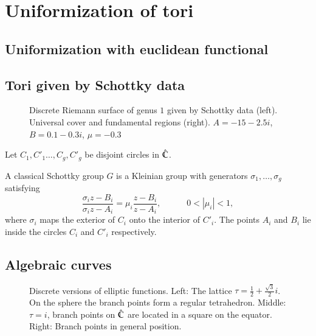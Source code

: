 \documentclass[Thesis.tex]{subfiles}
\begin{document}
  \section{Uniformization of tori}
  \label{sec:tori}

  \subsection{Uniformization with euclidean functional}

  \subsection{Tori given by Schottky data}

  \begin{figure}
  \centering
      \caption{Discrete Riemann surface of genus $1$ given by Schottky data (left). Universal cover and fundamental regions (right). $A=-15-2.5i$, $B=0.1-0.3i$, $\mu=-0.3$}
  \label{fig:schottky_g1}
  \end{figure}

  Let $C_1,C'_1\ldots,C_g,C'_g$ be disjoint circles in $\hat{\mathbb C}$.
  \begin{definition} A classical Schottky group $G$ is a Kleinian group with generators $\sigma_1,\ldots,\sigma_g$ satisfying
  \[
  \frac{\sigma_i z - B_i}{\sigma_i z - A_i} = \mu_i \frac{z - B_i}{z - A_i},
  \quad\quad\quad 0 < \left|\mu_i\right|<1,
  \]
  where $\sigma_i$ maps the exterior of $C_i$ onto the interior of $C'_i$. The points $A_i$ and $B_i$ lie inside the circles $C_i$ and $C'_i$ respectively.
  \end{definition}

  \subsection{Algebraic curves}
  \label{sec:discrete_algebraic_curves}

  \begin{figure}
      \centering
      \caption{Discrete versions of elliptic functions. Left: The lattice $\tau=\frac{1}{2}+\frac{\sqrt 3}{2}i$. On the sphere the branch points form a regular tetrahedron. Middle: $\tau=i$, branch points on $\hat {\mathbb C}$ are located in a square on the equator. Right: Branch points in general position.}
      \label{fig:p_functions}
  \end{figure}
\end{document}

